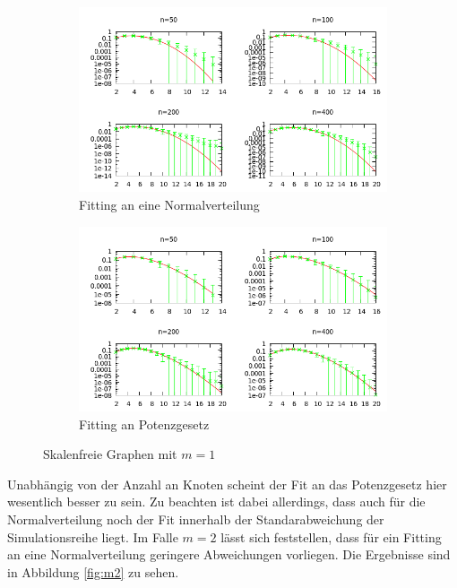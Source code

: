 \documentclass[10pt]{article}
\begin{document}
\begin{figure}[h!]
\begin{subfigure}{.5\textwidth}
  \centering
  \includegraphics[width=1\linewidth]{../Results/wErrorbars_Normal_M1.png}
  \caption{Fitting an eine Normalverteilung}
\end{subfigure}%
\begin{subfigure}{.5\textwidth}
  \centering
  \includegraphics[width=1\linewidth]{../Results/wErrorbars_Power_M1.png}
  \caption{Fitting an Potenzgesetz}
\end{subfigure}
\caption{Skalenfreie Graphen mit $m=1$}
\label{fig:m1}
\end{figure}

Unabhängig von der Anzahl an Knoten scheint der Fit an das Potenzgesetz hier wesentlich besser zu sein. Zu beachten ist dabei allerdings, dass auch für die Normalverteilung noch der Fit innerhalb der Standarabweichung der Simulationsreihe liegt. Im Falle $m=2$ lässt sich feststellen, dass für ein Fitting an eine Normalverteilung geringere Abweichungen vorliegen. Die Ergebnisse sind in Abbildung \ref{fig:m2} zu sehen.
\end{document}

